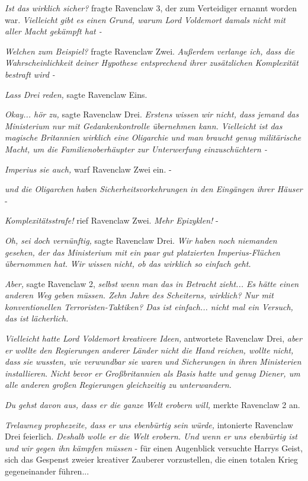 \emph{Ist das wirklich sicher?} fragte Ravenclaw 3, der zum Verteidiger ernannt
worden war. \emph{Vielleicht gibt es einen Grund, warum Lord Voldemort damals
nicht mit aller Macht gekämpft hat -}

\emph{Welchen zum Beispiel?} fragte Ravenclaw Zwei. \emph{Außerdem verlange ich,
dass die Wahrscheinlichkeit deiner Hypothese entsprechend ihrer zusätzlichen
Komplexität bestraft wird -}

\emph{Lass Drei reden,} sagte Ravenclaw Eins.

\emph{Okay... hör zu, }sagte Ravenclaw Drei. \emph{Erstens wissen wir nicht,
dass jemand das Ministerium nur mit Gedankenkontrolle übernehmen kann.
Vielleicht ist das magische Britannien wirklich eine Oligarchie und man braucht
genug militärische Macht, um die Familienoberhäupter zur Unterwerfung
einzuschüchtern -}

\emph{Imperius sie auch, }warf Ravenclaw Zwei ein. -

\emph{und die Oligarchen haben Sicherheitsvorkehrungen in den Eingängen ihrer
Häuser} -

\emph{Komplexitätsstrafe! }rief Ravenclaw Zwei. \emph{Mehr Epizyklen!} -

\emph{Oh, sei doch vernünftig,} sagte Ravenclaw Drei. \emph{Wir haben noch
niemanden gesehen, der das Ministerium mit ein paar gut platzierten
Imperius-Flüchen übernommen hat. }\emph{Wir wissen nicht, ob das wirklich so
einfach geht.}

\emph{Aber,} sagte Ravenclaw 2, \emph{selbst wenn man das in Betracht zieht...
Es hätte einen anderen Weg geben müssen. Zehn Jahre des Scheiterns, wirklich?
Nur mit konventionellen Terroristen-Taktiken? Das ist einfach... nicht mal ein
Versuch, das ist lächerlich.}

\emph{Vielleicht hatte Lord Voldemort kreativere Ideen,} antwortete Ravenclaw
Drei,\emph{ aber er wollte den Regierungen anderer Länder nicht die Hand
reichen, wollte nicht, dass} \emph{sie wussten, wie verwundbar sie waren und
Sicherungen in ihren Ministerien installieren}. \emph{Nicht bevor er
Großbritannien als Basis hatte und genug Diener, um alle anderen großen
Regierungen gleichzeitig zu unterwandern.}

\emph{Du gehst davon aus, dass er die ganze Welt erobern will, }merkte Ravenclaw
2 an.

\emph{Trelawney prophezeite, dass er uns ebenbürtig sein würde, }intonierte
Ravenclaw Drei feierlich. \emph{Deshalb wolle er die Welt erobern. Und wenn er
uns ebenbürtig ist und wir gegen ihn kämpfen müssen }- für einen Augenblick
versuchte Harrys Geist, sich das Gespenst zweier kreativer Zauberer
vorzustellen, die einen totalen Krieg gegeneinander führen...

